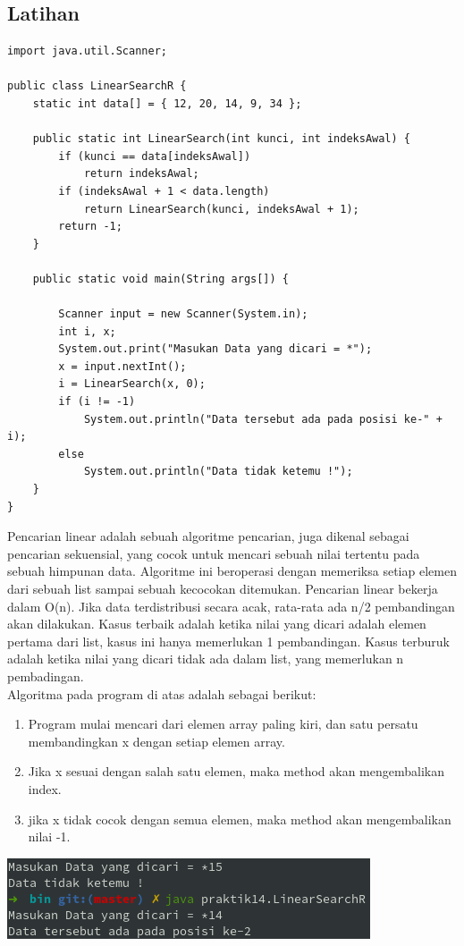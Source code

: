 \documentclass[a4paper,12pt]{article}
\begin{document}
\subsection{Latihan}
\begin{lstlisting}
import java.util.Scanner;

public class LinearSearchR {
    static int data[] = { 12, 20, 14, 9, 34 };

    public static int LinearSearch(int kunci, int indeksAwal) {
        if (kunci == data[indeksAwal])
            return indeksAwal;
        if (indeksAwal + 1 < data.length)
            return LinearSearch(kunci, indeksAwal + 1);
        return -1;
    }

    public static void main(String args[]) {

        Scanner input = new Scanner(System.in);
        int i, x;
        System.out.print("Masukan Data yang dicari = *");
        x = input.nextInt();
        i = LinearSearch(x, 0);
        if (i != -1)
            System.out.println("Data tersebut ada pada posisi ke-" + i);
        else
            System.out.println("Data tidak ketemu !");
    }
}
\end{lstlisting}

Pencarian linear adalah sebuah algoritme pencarian, juga dikenal sebagai pencarian sekuensial, yang cocok untuk mencari
sebuah nilai tertentu pada sebuah himpunan data. 
Algoritme ini beroperasi dengan memeriksa setiap elemen dari sebuah list sampai sebuah kecocokan ditemukan. Pencarian
linear bekerja dalam O(n). Jika data terdistribusi secara acak, rata-rata ada n/2 pembandingan akan dilakukan. Kasus
terbaik adalah ketika nilai yang dicari adalah elemen pertama dari list, kasus ini hanya memerlukan 1 pembandingan.
Kasus terburuk adalah ketika nilai yang dicari tidak ada dalam list, yang memerlukan n pembadingan.\\

Algoritma pada program di atas adalah sebagai berikut:
\begin{enumerate}
    \item Program mulai mencari dari elemen array paling kiri, dan satu persatu membandingkan x dengan setiap elemen
        array.
    \item Jika x sesuai dengan salah satu elemen, maka method akan mengembalikan index.
    \item jika x tidak cocok dengan semua elemen, maka method akan mengembalikan nilai -1.
\end{enumerate}
\begin{center}
    \includegraphics[scale=1]{2.png} 
\end{center}
\end{document}
